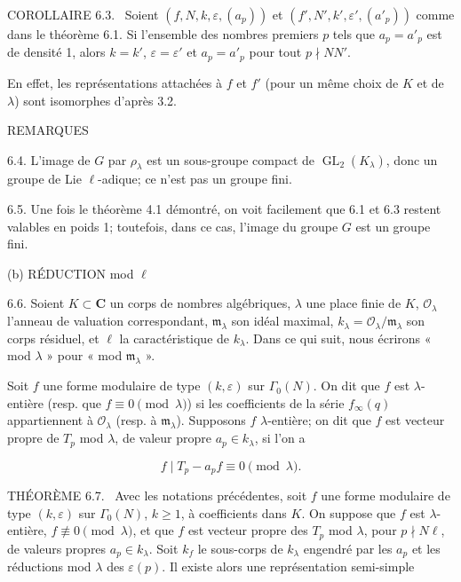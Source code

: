 \documentclass[10pt,oneside]{article}
\begin{document}
\noindent\textsc{COROLLAIRE 6.3.} \textemdash\ Soient \((f,N,k,\varepsilon,(a_p))\) et \((f',N',k',\varepsilon',(a'_p))\) comme dans le théorème 6.1. Si l'ensemble des nombres premiers \(p\) tels que \(a_p=a'_p\) est de densité 1, alors \(k=k'\), \(\varepsilon=\varepsilon'\) et \(a_p=a'_p\) pour tout \(p\nmid NN'\).\par

En effet, les représentations attachées à \(f\) et \(f'\) (pour un même choix de \(K\) et de \(\lambda\)) sont isomorphes d'après 3.2.\par

REMARQUES\par

6.4. L'image de \(G\) par \(\rho_\lambda\) est un sous-groupe compact de \(\operatorname{GL}_2(K_\lambda)\), donc un groupe de Lie \(\ell\)-adique; ce n'est pas un groupe fini.\par

6.5. Une fois le théorème 4.1 démontré, on voit facilement \footnotemark[2] que 6.1 et 6.3 restent valables en poids 1; toutefois, dans ce cas, l'image du groupe \(G\) est un groupe fini.\par

(b) RÉDUCTION mod \(\ell\)\par

6.6. Soient \(K\subset\mathbf{C}\) un corps de nombres algébriques, \(\lambda\) une place finie de \(K\), \(\mathcal{O}_\lambda\) l'anneau de valuation correspondant, \(\mathfrak{m}_\lambda\) son idéal maximal, \(k_\lambda=\mathcal{O}_\lambda/\mathfrak{m}_\lambda\) son corps résiduel, et \(\ell\) la caractéristique de \(k_\lambda\). Dans ce qui suit, nous écrirons « mod \(\lambda\) » pour « mod \(\mathfrak{m}_\lambda\) ».\par

Soit \(f\) une forme modulaire de type \((k,\varepsilon)\) sur \(\Gamma_0(N)\). On dit que \(f\) est \(\lambda\)-entière (resp. que \(f\equiv0\pmod\lambda\)) si les coefficients de la série \(f_\infty(q)\) appartiennent à \(\mathcal{O}_\lambda\) (resp. à \(\mathfrak{m}_\lambda\)). Supposons \(f\) \(\lambda\)-entière; on dit que \(f\) est vecteur propre de \(T_p\) mod \(\lambda\), de valeur propre \(a_p\in k_\lambda\), si l'on a\par

\begin{equation*}
\tag{6.6.1}
f\mid T_p-a_pf\equiv0\pmod\lambda.
\end{equation*}

\noindent\textsc{THÉORÈME 6.7.} \textemdash\ Avec les notations précédentes, soit \(f\) une forme modulaire de type \((k,\varepsilon)\) sur \(\Gamma_0(N)\), \(k\geq1\), à coefficients dans \(K\). On suppose que \(f\) est \(\lambda\)-entière, \(f\not\equiv0\pmod\lambda\), et que \(f\) est vecteur propre des \(T_p\) mod \(\lambda\), pour \(p\nmid N\ell\), de valeurs propres \(a_p\in k_\lambda\). Soit \(k_f\) le sous-corps de \(k_\lambda\) engendré par les \(a_p\) et les réductions mod \(\lambda\) des \(\varepsilon(p)\). Il existe alors une représentation semi-simple\par
\end{document}
